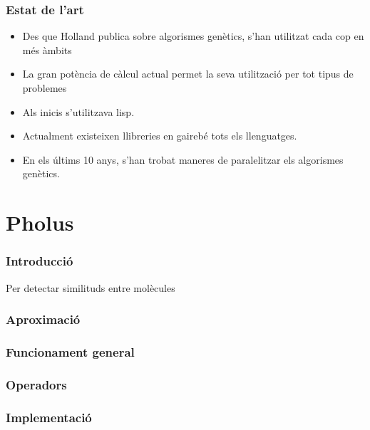 \documentclass{beamer}
\begin{document}
\begin{frame}
\frametitle{Estat de l'art}
\begin{itemize}
\item Des que Holland publica sobre algorismes genètics, s'han utilitzat cada
cop en més àmbits
\item La gran potència de càlcul actual permet la seva utilització per tot tipus
de problemes
\pause
\item Als inicis s'utilitzava lisp.
\item Actualment existeixen llibreries en gairebé tots els llenguatges.
\item En els últims 10 anys, s'han trobat maneres de paralelitzar els algorismes
genètics.
\end{itemize}
\end{frame}


\section{Pholus} %
\label{sec:Pholus}

\begin{frame}
	\frametitle{Introducció}
	Per detectar similituds entre molècules 
\end{frame}

\begin{frame}
\frametitle{Aproximació}
\end{frame}

\begin{frame}
\frametitle{Funcionament general}
\end{frame}

\begin{frame}
\frametitle{Operadors}
\end{frame}

\begin{frame}
\frametitle{Implementació}
\end{frame}
\end{document}

